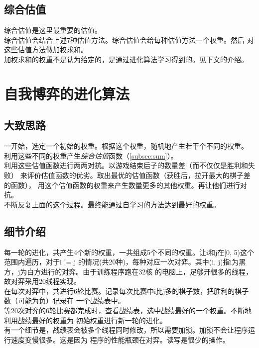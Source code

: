 \documentclass[a4paper]{article}
\begin{document}
\subsection{综合估值}\label{subsec:sum}
综合估值是这里最重要的估值。\\

综合估值会结合上述7种估值方法。综合估值会给每种估值方法一个权重。然后
对这些估值方法做加权求和。\\

加权求和的权重不是认为给定的，是通过进化算法学习得到的。见下文的介绍。

\section{自我博弈的进化算法}
\subsection{大致思路}
一开始，选定一个初始的权重。根据这个权重，随机地产生若干个不同的权重。
利用这些不同的权重产生\emph{综合估值}函数（\autoref{subsec:sum}）。\\

利用这些估值函数进行两两对抗。以游戏结束后子的数量差（而不仅仅是胜利和失败）
来评价估值函数的优劣。取出最优的估值函数（获胜后，拉开最大的棋子差的函数），
用这个估值函数的权重来产生数量更多的其他权重。再让他们进行对抗。\\

不断反复上面的这个过程。最终能通过自学习的方法达到最好的权重。

\subsection{细节介绍}
每一轮的进化，共产生4个新的权重，一共组成5个不同的权重。让i和j在[0, 5)这个范围内遍历，对于i != j
的情况(共20种)，每种对应一次对弈。其中(i, j)指i为黑方，j为白方进行的对弈。由于训练程序跑在32核
的电脑上，足够开很多的线程，故对弈采用20线程实现。\\

在每次对弈中，共进行6轮比赛。记录每次比赛中i比j多的棋子数，把胜利的棋子数（可能为负）记录在
一个战绩表中。\\

等20次对弈的6轮比赛都完成时，查看战绩表，选中战绩最好的一个权重。不断地利用战绩最好的权重为
初始权重进行新一轮的进化。\\

有一个细节是，战绩表会被多个线程同时修改，所以需要加锁。加锁不会让程序运行速度变慢很多。这是因为
程序的性能瓶颈在对弈。读写是很少的操作。
\end{document}
